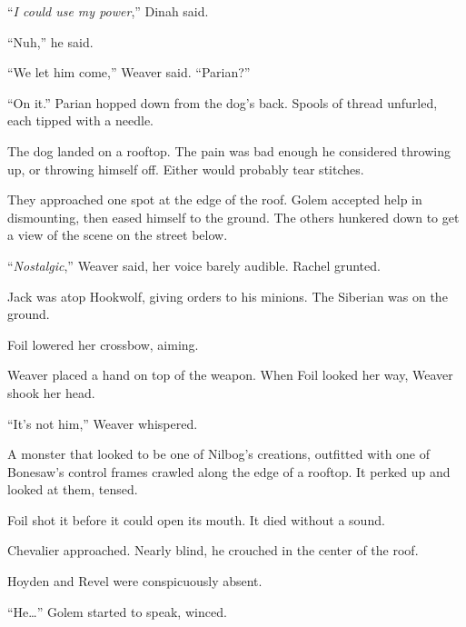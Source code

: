``\emph{I could use my power},'' Dinah said.



``Nuh,'' he said.



``We let him come,'' Weaver said.  ``Parian?''



``On it.''  Parian hopped down from the dog's back.  Spools of thread unfurled, each tipped with a needle.



\blacksquare



The dog landed on a rooftop.  The pain was bad enough he considered throwing up, or throwing himself off.  Either would probably tear stitches.



They approached one spot at the edge of the roof.  Golem accepted help in dismounting, then eased himself to the ground.  The others hunkered down to get a view of the scene on the street below.



``\emph{Nostalgic},'' Weaver said, her voice barely audible.  Rachel grunted.



Jack was atop Hookwolf, giving orders to his minions.  The Siberian was on the ground.



Foil lowered her crossbow, aiming.



Weaver placed a hand on top of the weapon.  When Foil looked her way, Weaver shook her head.



``It's not him,'' Weaver whispered.



A monster that looked to be one of Nilbog's creations, outfitted with one of Bonesaw's control frames crawled along the edge of a rooftop.  It perked up and looked at them, tensed.



Foil shot it before it could open its mouth.  It died without a sound.



Chevalier approached.  Nearly blind, he crouched in the center of the roof.



Hoyden and Revel were conspicuously absent.



``He\ldots'' Golem started to speak, winced.



